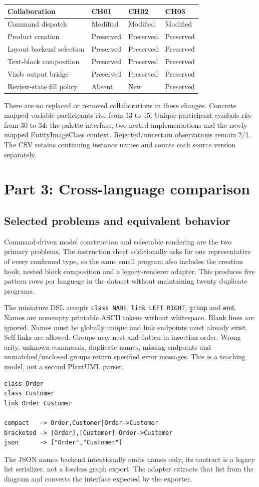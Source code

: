 \documentclass[11pt,a4paper]{article}
\begin{document}
\begin{tabularx}{\linewidth}{@{}Xlll@{}}\toprule
Collaboration & CH01 & CH02 & CH03\\\midrule
Command dispatch & Modified & Modified & Modified\\
Product creation & Preserved & Preserved & Preserved\\
Layout backend selection & Preserved & Preserved & Preserved\\
Text-block composition & Preserved & Preserved & Preserved\\
VizJs output bridge & Preserved & Preserved & Preserved\\
Review-state fill policy & Absent & New & Preserved\\\bottomrule
\end{tabularx}

There are no replaced or removed collaborations in these changes. Concrete
mapped variable participants rise from 13 to 15. Unique participant symbols rise
from 30 to 34: the palette interface, two nested implementations and the newly
mapped EntityImageClass context. Rejected/uncertain observations remain 2/1.
The CSV retains continuing instance names and counts each source version separately.

\clearpage\section{Part 3: Cross-language comparison}
\subsection{Selected problems and equivalent behavior}
Command-driven model construction and selectable rendering are the two primary
problems. The instruction sheet additionally asks for one representative of every
confirmed type, so the same small program also includes the creation hook, nested
block composition and a legacy-renderer adapter. This produces five pattern rows
per language in the dataset without maintaining twenty duplicate programs.

The miniature DSL accepts \texttt{class NAME}, \texttt{link LEFT RIGHT},
\texttt{group} and \texttt{end}. Names are nonempty printable ASCII tokens without
whitespace. Blank lines are ignored. Names must be globally unique and link
endpoints must already exist. Self-links are allowed. Groups may nest and flatten
in insertion order. Wrong arity, unknown commands, duplicate names, missing
endpoints and unmatched/unclosed groups return specified error messages.
This is a teaching model, not a second PlantUML parser.
\begin{lstlisting}
class Order
class Customer
link Order Customer

compact   -> Order,Customer|Order->Customer
bracketed -> [Order],[Customer]|Order->Customer
json      -> ["Order","Customer"]
\end{lstlisting}
The JSON names backend intentionally emits names only; its contract is a
legacy list serializer, not a lossless graph export. The adapter extracts that list
from the diagram and converts the interface expected by the exporter.
\end{document}

